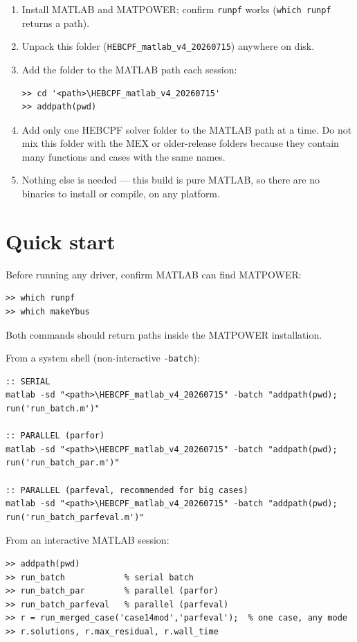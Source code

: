 \documentclass[11pt,a4paper]{article}
\newcommand{\code}[1]{\texttt{#1}}
\begin{document}
\begin{enumerate}[leftmargin=1.6em]
  \item Install MATLAB and MATPOWER; confirm \code{runpf} works
        (\code{which runpf} returns a path).
  \item Unpack this folder (\code{HEBCPF_matlab_v4_20260715}) anywhere on disk.
  \item Add the folder to the MATLAB path each session:
\begin{lstlisting}
>> cd '<path>\HEBCPF_matlab_v4_20260715'
>> addpath(pwd)
\end{lstlisting}
  \item Add only one HEBCPF solver folder to the MATLAB path at a time. Do not mix this
        folder with the MEX or older-release folders because they contain many functions
        and cases with the same names.
  \item Nothing else is needed --- this build is pure MATLAB, so there are no binaries to
        install or compile, on any platform.
\end{enumerate}

\section{Quick start}

Before running any driver, confirm MATLAB can find MATPOWER:
\begin{lstlisting}[style=mat]
>> which runpf
>> which makeYbus
\end{lstlisting}
Both commands should return paths inside the MATPOWER installation.

From a system shell (non-interactive \code{-batch}):
\begin{lstlisting}[style=sh]
:: SERIAL
matlab -sd "<path>\HEBCPF_matlab_v4_20260715" -batch "addpath(pwd); run('run_batch.m')"

:: PARALLEL (parfor)
matlab -sd "<path>\HEBCPF_matlab_v4_20260715" -batch "addpath(pwd); run('run_batch_par.m')"

:: PARALLEL (parfeval, recommended for big cases)
matlab -sd "<path>\HEBCPF_matlab_v4_20260715" -batch "addpath(pwd); run('run_batch_parfeval.m')"
\end{lstlisting}

From an interactive MATLAB session:
\begin{lstlisting}[style=mat]
>> addpath(pwd)
>> run_batch            % serial batch
>> run_batch_par        % parallel (parfor)
>> run_batch_parfeval   % parallel (parfeval)
>> r = run_merged_case('case14mod','parfeval');  % one case, any mode
>> r.solutions, r.max_residual, r.wall_time
\end{lstlisting}
\end{document}
